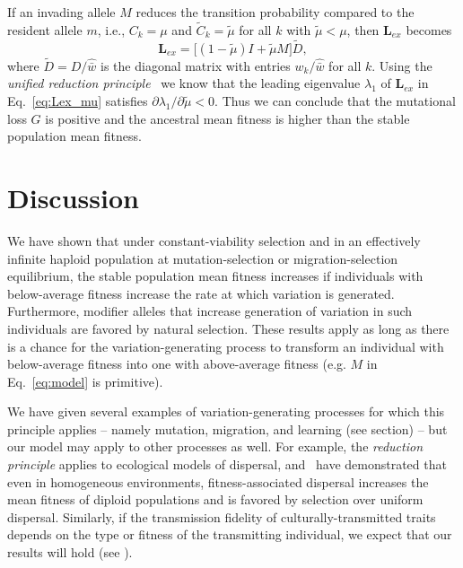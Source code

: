 \documentclass[9pt, a4paper, twocolumn]{extarticle}
\newcommand{\cl}{\mathbf{L}}
\begin{document}
If an invading  allele $M$ reduces the transition probability compared to the resident allele $m$, i.e., $C_k = \mu$ and $\tilde{C}_k = \tilde{\mu}$ for all $k$ with $\tilde{\mu}<\mu$, then $\cl_{ex}$ becomes
\begin{equation} \label{eq:Lex_mu}
\cl_{ex} = \bigl[(1 - \tilde\mu)I + \tilde\mu M\bigr] \tilde{D},
\end{equation} 
where $\tilde{D} =D/\hat{\bar{w}}$ is  the diagonal matrix with entries $w_k/\hat{\bar{w}}$ for all $k$.
Using the \emph{unified reduction principle}~\citep{Altenberg2017} we know that the leading eigenvalue $\lambda_1$  of $\cl_{ex}$ in Eq.~\ref{eq:Lex_mu} satisfies $\partial\lambda_1 / \partial\tilde{\mu} < 0$.
Thus we can conclude that the mutational loss $G$ is positive and the ancestral mean fitness is higher than the stable population mean fitness. 

\section*{Discussion}

We have shown that under constant-viability selection and in an effectively infinite haploid population at mutation-selection or migration-selection equilibrium, the stable population mean fitness increases if individuals with below-average fitness increase the rate at which variation is generated. Furthermore, modifier alleles that  increase generation of variation in such individuals are favored by natural selection.
These results apply as long as there is a chance for the variation-generating process to transform an individual with below-average fitness into one with above-average fitness (e.g. $M$ in Eq.~\ref{eq:model} is primitive).

We have given several examples of variation-generating processes for which this principle applies -- namely mutation, migration, and learning (see \emph{} section) -- but our model may apply to other processes as well.
For example, the \emph{reduction principle} applies to ecological models of dispersal, and~\citet{Gueijman2013} have demonstrated that even in homogeneous environments, fitness-associated dispersal increases the mean fitness of diploid populations and is favored by selection over uniform dispersal.
Similarly, if the transmission fidelity of culturally-transmitted traits depends on the type or fitness of the transmitting individual, we expect that our results will hold (see ).
\end{document}
